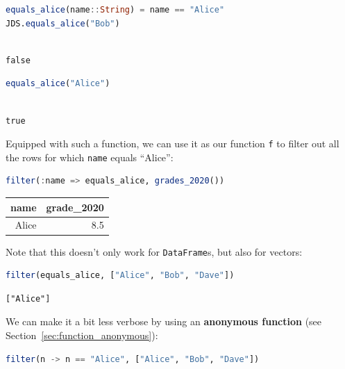 \documentclass[
  notoc %
]{tufte-book}
\newcommand{\passthrough}[1]{#1}
\begin{document}
\begin{lstlisting}[language=Julia]
equals_alice(name::String) = name == "Alice"
JDS.equals_alice("Bob")
\end{lstlisting}

\begin{lstlisting}[language=Output]

false

\end{lstlisting}

\begin{lstlisting}[language=Julia]
equals_alice("Alice")
\end{lstlisting}

\begin{lstlisting}[language=Output]

true

\end{lstlisting}

Equipped with such a function, we can use it as our function
\passthrough{\lstinline!f!} to filter out all the rows for which
\passthrough{\lstinline!name!} equals ``Alice'':

\begin{lstlisting}[language=Julia]
filter(:name => equals_alice, grades_2020())
\end{lstlisting}

\begin{longtable}[]{@{}rr@{}}
\toprule()
name & grade\_2020 \\
\midrule()
\endhead
Alice & 8.5 \\
\bottomrule()
\end{longtable}

Note that this doesn't only work for
\passthrough{\lstinline!DataFrame!}s, but also for vectors:

\begin{lstlisting}[language=Julia]
filter(equals_alice, ["Alice", "Bob", "Dave"])
\end{lstlisting}

\begin{lstlisting}[language=Output]
["Alice"]
\end{lstlisting}

We can make it a bit less verbose by using an \textbf{anonymous
function} (see Section~\ref{sec:function_anonymous}):

\begin{lstlisting}[language=Julia]
filter(n -> n == "Alice", ["Alice", "Bob", "Dave"])
\end{lstlisting}
\end{document}
